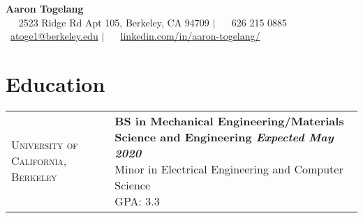 \documentclass[letterpaper, 10pt]{article}
\begin{document}

\begin{center}
  \huge{\textbf{Aaron Togelang}} \medskip \\
  \large{\ \normalsize{\faHome} \ 2523 Ridge Rd Apt 105, Berkeley, CA 94709 $|$ \ \normalsize{\faPhone} \ 626 215 0885 \\ \normalsize{\faEnvelope} \ \href{mailto:atoge1@berkeley.edu}{atoge1@berkeley.edu} $|$ \ \normalsize{\faLinkedinSquare} \ \href{https://www.linkedin.com/in/aaron-togelang/}{linkedin.com/in/aaron-togelang/} }
\end{center}


%
%
\section{Education}
\begin{flushleft}
  \begin{tabular}{>{\raggedright}p{1.3in}  @{\hskip .2in} l}
      \textsc{University of California, Berkeley}   & \parbox[t]{5.75in}{\textbf{BS in Mechanical Engineering/Materials Science and Engineering \hfill\textit{Expected May 2020}} \smallskip \\ Minor in Electrical Engineering and Computer Science\\ GPA: 3.3
       } \\


  \end{tabular}
\end{flushleft}
\end{document}
